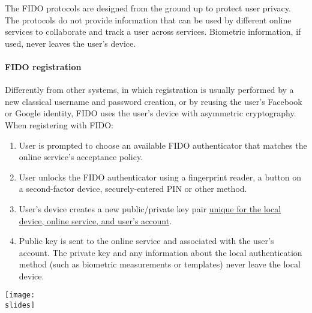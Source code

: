 The FIDO protocols are designed from the ground up to protect user privacy. The protocols do not provide information that can be used by different online services to collaborate and track a user across services. Biometric information, if used, never leaves the user's device.




\paragraph*{FIDO registration}
Differently from other systems, in which registration is usually performed by a new classical username and password creation, or by reusing the user's Facebook or Google identity, FIDO uses the user's device with asymmetric cryptography. When registering with FIDO:



\noindent
\begin{minipage}{0.4\textwidth}
  \begin{enumerate}
    \item User is prompted to choose an available FIDO authenticator that matches the online service's acceptance policy.
    \item User unlocks the FIDO authenticator using a fingerprint reader, a button on a second-factor device, securely-entered PIN or other method.
    \item User's device creates a new public/private key pair \ul{unique for the local device, online service, and user's account}.
    \item Public key is sent to the online service and associated with the user's account. The private key and any information about the local authentication method (such as biometric measurements or templates) never leave the local device.
  \end{enumerate}
\end{minipage}
\hspace{0.05\textwidth}
\begin{minipage}{0.5\textwidth}
  \centering
  \texttt{[image: \\slides]}
\end{minipage}


